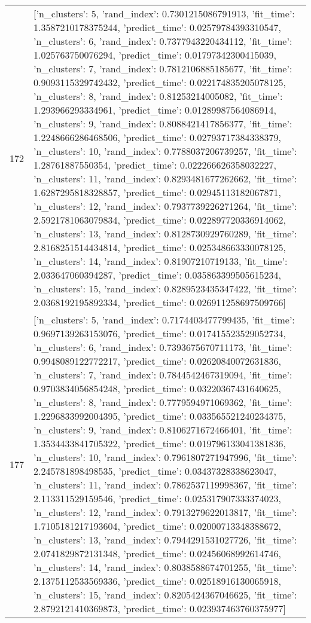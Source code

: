 \begin{tabular}{rl}
172 & [{'n_clusters': 5, 'rand_index': 0.7301215086791913, 'fit_time': 1.3587210178375244, 'predict_time': 0.02579784393310547}, {'n_clusters': 6, 'rand_index': 0.7377943220434112, 'fit_time': 1.025763750076294, 'predict_time': 0.01797342300415039}, {'n_clusters': 7, 'rand_index': 0.7812106885185677, 'fit_time': 0.9093115329742432, 'predict_time': 0.022174835205078125}, {'n_clusters': 8, 'rand_index': 0.81253214005082, 'fit_time': 1.293966293334961, 'predict_time': 0.01289987564086914}, {'n_clusters': 9, 'rand_index': 0.8088421417856377, 'fit_time': 1.2248666286468506, 'predict_time': 0.02793717384338379}, {'n_clusters': 10, 'rand_index': 0.7788037206739257, 'fit_time': 1.28761887550354, 'predict_time': 0.022266626358032227}, {'n_clusters': 11, 'rand_index': 0.8293481677262662, 'fit_time': 1.6287295818328857, 'predict_time': 0.02945113182067871}, {'n_clusters': 12, 'rand_index': 0.7937739226271264, 'fit_time': 2.5921781063079834, 'predict_time': 0.022897720336914062}, {'n_clusters': 13, 'rand_index': 0.8128730929760289, 'fit_time': 2.8168251514434814, 'predict_time': 0.025348663330078125}, {'n_clusters': 14, 'rand_index': 0.81907210719133, 'fit_time': 2.033647060394287, 'predict_time': 0.035863399505615234}, {'n_clusters': 15, 'rand_index': 0.8289523435347422, 'fit_time': 2.0368192195892334, 'predict_time': 0.026911258697509766}] \\
177 & [{'n_clusters': 5, 'rand_index': 0.7174403477799435, 'fit_time': 0.9697139263153076, 'predict_time': 0.017415523529052734}, {'n_clusters': 6, 'rand_index': 0.7393675670711173, 'fit_time': 0.9948089122772217, 'predict_time': 0.02620840072631836}, {'n_clusters': 7, 'rand_index': 0.7844542467319094, 'fit_time': 0.9703834056854248, 'predict_time': 0.03220367431640625}, {'n_clusters': 8, 'rand_index': 0.7779594971069362, 'fit_time': 1.2296833992004395, 'predict_time': 0.033565521240234375}, {'n_clusters': 9, 'rand_index': 0.8106271672466401, 'fit_time': 1.3534433841705322, 'predict_time': 0.019796133041381836}, {'n_clusters': 10, 'rand_index': 0.7961807271947996, 'fit_time': 2.245781898498535, 'predict_time': 0.03437328338623047}, {'n_clusters': 11, 'rand_index': 0.7862537119998367, 'fit_time': 2.113311529159546, 'predict_time': 0.025317907333374023}, {'n_clusters': 12, 'rand_index': 0.7913279622013817, 'fit_time': 1.7105181217193604, 'predict_time': 0.02000713348388672}, {'n_clusters': 13, 'rand_index': 0.7944291531027726, 'fit_time': 2.0741829872131348, 'predict_time': 0.02456068992614746}, {'n_clusters': 14, 'rand_index': 0.8038588674701255, 'fit_time': 2.1375112533569336, 'predict_time': 0.02518916130065918}, {'n_clusters': 15, 'rand_index': 0.8205424367046625, 'fit_time': 2.8792121410369873, 'predict_time': 0.023937463760375977}] \\

\end{tabular}
